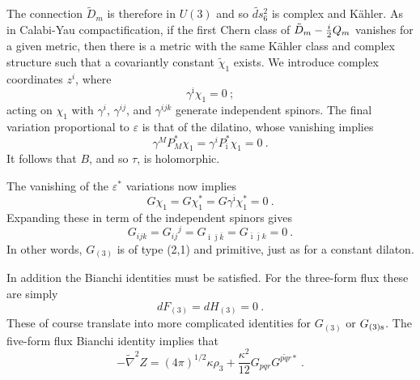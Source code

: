 \documentclass[a4paper,12pt]{article}
\renewcommand{\=}[1]{\bar{#1}}
\begin{document}
The
connection $\tilde D_m$ is therefore in $U(3)$ and so $\widetilde{ds}{}_6^2$
is complex and K\"ahler.  As in Calabi-Yau compactification, if the first
Chern class of $\tilde D_{m} -{i\over2} Q_m$ vanishes for a given metric,
then there is a metric with the same K\"ahler class and complex structure
such that a covariantly constant $\tilde\chi_1$ exists.
We introduce complex coordinates $z^i$, where
\begin{equation}
\gamma^{\bar\imath} \chi_1 = 0\ ;
\end{equation}
acting on $\chi_1$ with $\gamma^i$, $\gamma^{ij}$, and $\gamma^{ijk}$
generate independent spinors.
The final variation proportional to $\varepsilon$ is that of the dilatino,
whose vanishing implies
\begin{equation}
\gamma^{M}P_{M}^*\chi_1 = \gamma^{i}P_{\bar \imath}^*\chi_1 = 0\ .
\label{dilholo}
\end{equation}
It follows that $B$, and so $\tau$, is holomorphic.

The vanishing of the $\varepsilon^*$ variations now implies
\begin{equation}
G \chi_1 = G \chi_1^* = G \gamma^{\bar \imath} \chi_1^* = 0\ .
\label{conditions}
\end{equation}
Expanding these in term of the independent spinors gives
\begin{equation}
G_{ijk} = G_{ij}\!^j = G_{\bar\imath\bar\jmath\bar k} =
G_{\bar\imath\bar\jmath k} = 0\ . \label{21}
\end{equation}
In other words, $G_{(3)}$ is of type (2,1) and primitive, just as for a constant
dilaton.

In addition the Bianchi identities must be satisfied.  For the three-form flux
these are simply
\begin{equation}
dF_{(3)} = dH_{(3)} = 0 \ .
\end{equation}
These of course translate into more complicated identities for $G_{(3)}$ or
$G_{(3)\rm s}$. The five-form flux Bianchi identity implies that
\begin{equation}
- \widetilde\nabla^2 Z = (4\pi)^{1/2} \kappa \rho_3 + \frac{\kappa^2}{12}
G_{pqr} G^{\widetilde{pqr}*} \ .
\label{3den}
\end{equation}
\end{document}
